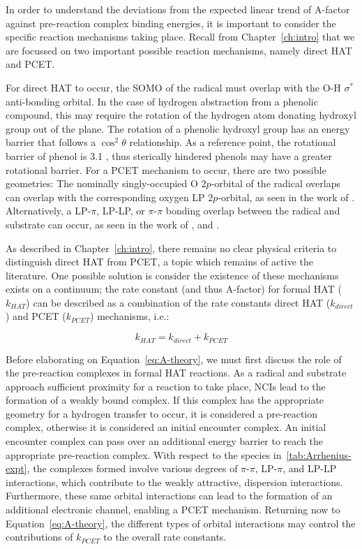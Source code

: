 In order to understand the deviations from the expected linear trend of A-factor
against pre-reaction complex binding energies, it is important to consider the
specific reaction mechanisms taking place. Recall from Chapter~\ref{ch:intro}
that we are focussed on two important possible reaction mechanisms, namely
direct HAT and PCET.

For direct HAT to occur, the SOMO of the radical must overlap with the O-H
$\sigma^*$ anti-bonding orbital. In the case of hydrogen abstraction from a
phenolic compound, this may require the rotation of the hydrogen atom donating
hydroxyl group out of the plane. The rotation of a phenolic hydroxyl group has
an energy barrier that follows a $\cos^2 \theta$ relationship.\cite{Kojima1960}
As a reference point, the rotational barrier of phenol\cite{Kim1994} is 3.1
\kcalmol, thus sterically hindered phenols may have a greater rotational
barrier. For a PCET mechanism to occur, there are two possible geometries:
The nominally singly-occupied O $2p$-orbital of the radical overlaps can
overlap with the corresponding oxygen LP $2p$-orbital, as seen in the work of
\citet{Mayer2002}. Alternatively, a LP-$\pi$, LP-LP, or $\pi$-$\pi$ bonding
overlap between the radical and substrate can occur, as seen in the work of
\citet{DiLabio2005}, and \citet{DiLabio2007}.

As described in Chapter~\ref{ch:intro}, there remains no clear physical criteria
to distinguish direct HAT from PCET, a topic which remains of active the
literature.\cite{Cukier1998, Mayer2002, Stubbe2003, Mayer2004, DiLabio2007,
Huynh2007, HammesSchiffer2008, Mayer2010, Weinberg2012, HammesSchiffer2015,
MunozRugeles2017} One possible solution is consider the existence of these
mechanisms exists on a continuum; the rate constant (and thus A-factor) for
formal HAT ($k_{HAT}$) can be described as a combination of the rate constants
direct HAT ($k_{direct}$) and PCET ($k_{PCET}$) mechanisms, i.e.:

\begin{equation}
  k_{HAT} = k_{direct} + k_{PCET}
  \label{eq:A-theory}
\end{equation}

Before elaborating on Equation~\ref{eq:A-theory}, we must first discuss the role
of the pre-reaction complexes in formal HAT reactions. As a radical and
substrate approach sufficient proximity for a reaction to take place, NCIs lead
to the formation of a weakly bound complex. If this complex has the appropriate
geometry for a hydrogen transfer to occur, it is considered a pre-reaction
complex, otherwise it is considered an initial encounter complex. An initial
encounter complex can pass over an additional energy barrier to reach the
appropriate pre-reaction complex. With respect to the species
in~\ref{tab:Arrhenius-expt}, the complexes formed involve various degrees of
$\pi$-$\pi$, LP-$\pi$, and LP-LP interactions, which contribute to the weakly
attractive, dispersion interactions. Furthermore, these same orbital
interactions can lead to the formation of an additional electronic channel,
enabling a PCET mechanism.\cite{DiLabio2005, DiLabio2007} Returning now to
Equation~\ref{eq:A-theory}, the different types of orbital interactions may
control the contributions of $k_{PCET}$ to the overall rate constants.

